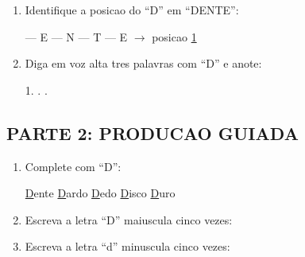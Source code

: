 \begin{exercicio}
\begin{enumerate}
  \item Identifique a posicao do ``D'' em ``DENTE'':
  \begin{center}
   --- E --- N --- T --- E $\rightarrow$ posicao \underline{1}
  \end{center}

  \item Diga em voz alta tres palavras com ``D'' e anote:
  \begin{center}
  1. \underline{\hspace{4cm}} . \underline{\hspace{4cm}} . \underline{\hspace{4cm}}
  \end{center}
\end{enumerate}

\subsection*{PARTE 2: PRODUCAO GUIADA}

\begin{enumerate}[resume]
  \item Complete com ``D'':
  \begin{center}
  \underline{D}ente \quad \underline{D}ardo \quad \underline{D}edo \quad \underline{D}isco \quad \underline{D}uro
  \end{center}

  \item Escreva a letra ``D'' maiuscula cinco vezes:
  \begin{center}
  \underline{\hspace{1.5cm}} \quad \underline{\hspace{1.5cm}} \quad \underline{\hspace{1.5cm}} \quad \underline{\hspace{1.5cm}} \quad \underline{\hspace{1.5cm}}
  \end{center}

  \item Escreva a letra ``d'' minuscula cinco vezes:
  \begin{center}
  \underline{\hspace{1.5cm}} \quad \underline{\hspace{1.5cm}} \quad \underline{\hspace{1.5cm}} \quad \underline{\hspace{1.5cm}} \quad \underline{\hspace{1.5cm}}
  \end{center}


\end{enumerate}
\end{exercicio}
